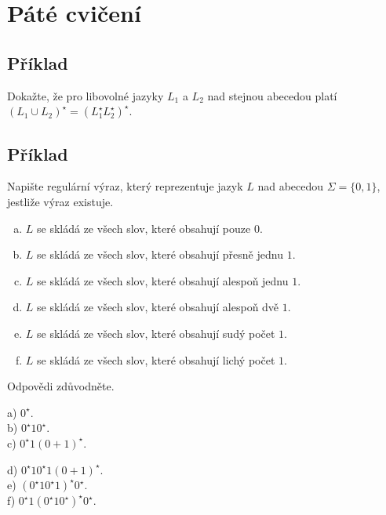 \section{Páté cvičení}

\subsection{Příklad}
Dokažte, že pro libovolné jazyky $L_1$ a $L_2$ nad stejnou abecedou platí $(L_1 \cup L_2)^\star = (L_1^\star L_2^\star)^\star$.


\subsection{Příklad}
Napište regulární výraz, který reprezentuje jazyk $L$ nad abecedou $\Sigma = \{0,1\}$, jestliže výraz existuje.
\begin{enumerate}[a), noitemsep]
    \item $L$ se skládá ze všech slov, které obsahují pouze $0$.
    \item $L$ se skládá ze všech slov, které obsahují přesně jednu $1$.
    \item $L$ se skládá ze všech slov, které obsahují alespoň jednu $1$.
    \item $L$ se skládá ze všech slov, které obsahují alespoň dvě $1$.
    \item $L$ se skládá ze všech slov, které obsahují sudý počet $1$.
    \item $L$ se skládá ze všech slov, které obsahují lichý počet $1$.
\end{enumerate}
Odpovědi zdůvodněte.

\begin{multicols}{2}
    a) $0^\star$.\\
    b) $0^\star 1 0^\star$.\\
    c) $0^\star 1 (0+1)^\star$.
\columnbreak

    d) $0^\star 1 0^\star 1 (0+1)^\star$.\\
    e) $(0^\star 1 0^\star 1)^\star 0^\star$.\\
    f) $0^\star 1 (0^\star 1 0^\star)^\star 0^\star$.
\end{multicols}


